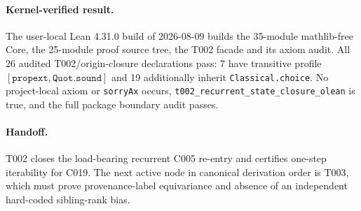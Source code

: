\paragraph*{Kernel-verified result.}
The user-local Lean 4.31.0 build of 2026-08-09 builds the 35-module mathlib-free
Core, the 25-module proof source tree, the T002 facade and its axiom audit.  All
26 audited T002/origin-closure declarations pass: 7 have transitive profile
$[\texttt{propext},\texttt{Quot.sound}]$ and 19 additionally inherit
\texttt{Classical.choice}.  No project-local axiom or \texttt{sorryAx} occurs,
\texttt{t002\_recurrent\_state\_closure\_olean} is true, and the full package
boundary audit passes.

\paragraph*{Handoff.}
T002 closes the load-bearing recurrent C005 re-entry and certifies one-step
iterability for C019.  The next active node in canonical derivation order is
T003, which must prove provenance-label equivariance and absence of an
independent hard-coded sibling-rank bias.
